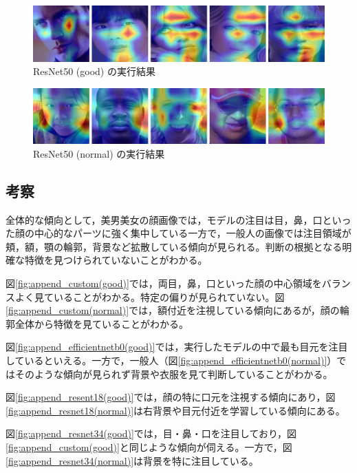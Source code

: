\documentclass[a4paper,11pt,titlepage]{jsarticle}
\begin{document}
\begin{figure}[H]
    \centering
    \includegraphics[width=1.1\textwidth]{resnet50(good).jpg}
    \caption{ResNet50 (good) の実行結果}
    \label{fig:append_resnet50(good)}
\end{figure}

\begin{figure}[H]
    \centering
    \includegraphics[width=1.1\textwidth]{resnet50(normal).jpg}
    \caption{ResNet50 (normal) の実行結果}
    \label{fig:append_resnet50(normal)}
\end{figure}


\subsection{考察}
全体的な傾向として，美男美女の顔画像では，モデルの注目は目，鼻，口といった顔の中心的なパーツに強く集中している一方で，一般人の画像では注目領域が頬，額，顎の輪郭，背景など拡散している傾向が見られる。判断の根拠となる明確な特徴を見つけられていないことがわかる。


図\ref{fig:append_custom(good)}では，両目，鼻，口といった顔の中心領域をバランスよく見ていることがわかる。特定の偏りが見られていない。図\ref{fig:append_custom(normal)}では，額付近を注視している傾向にあるが，顔の輪郭全体から特徴を見ていることがわかる。\par
図\ref{fig:append_efficientnetb0(good)}では，実行したモデルの中で最も目元を注目しているといえる。一方で，一般人（図\ref{fig:append_efficientnetb0(normal)}）ではそのような傾向が見られず背景や衣服を見て判断していることがわかる。\par

図\ref{fig:append_resent18(good)}では，顔の特に口元を注視する傾向にあり，図\ref{fig:append_resnet18(normal)}は右背景や目元付近を学習している傾向にある。\par
図\ref{fig:append_resnet34(good)}では，目・鼻・口を注目しており，図\ref{fig:append_custom(good)}と同じような傾向が伺える。一方で，図\ref{fig:append_resnet34(normal)}は背景を特に注目している。\par
\end{document}
